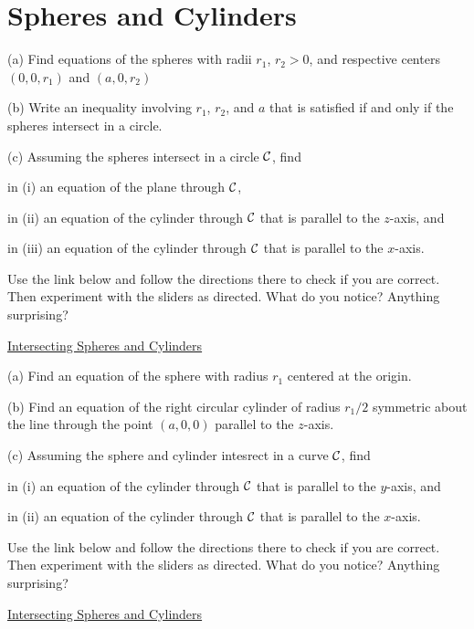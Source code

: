 \documentclass{ximera}
\begin{document}
\section{Spheres and Cylinders}
\begin{question}   \label{Q87:Coordinates}
(a) Find equations of the spheres with radii $r_1$, $r_2>0$, and respective centers $(0,0,r_1)$ and $(a,0,r_2)$

(b) Write an inequality involving $r_1$, $r_2$, and $a$ that is satisfied if and only if the spheres intersect in a circle.

(c) Assuming the spheres intersect in a circle  ${\cal C}$, find 

 in (i) an equation of the plane through  ${\cal C}$,

 in (ii) an equation of the cylinder through  ${\cal C}$ that is parallel to the $z$-axis, and

 in (iii) an equation of the cylinder through  ${\cal C}$ that is parallel to the $x$-axis.

Use the link below and follow the directions there to check if you are correct. Then experiment with the sliders as directed. What do you notice? Anything surprising?

\href{https://www.desmos.com/3d/93aea43a95}{Intersecting Spheres and Cylinders}

\end{question}



\begin{question}   \label{Q88:Coordinates}
(a) Find an equation of the sphere with radius $r_1$ centered at the origin.

(b) Find an equation of the right circular cylinder of radius $r_1/2$ symmetric about the line through the point $(a,0,0)$ parallel to the $z$-axis.

(c) Assuming the sphere and cylinder intesrect in a curve  ${\cal C}$, find 


 in (i) an equation of the cylinder through  ${\cal C}$ that is parallel to the $y$-axis, and

 in (ii) an equation of the cylinder through  ${\cal C}$ that is parallel to the $x$-axis.

Use the link below and follow the directions there to check if you are correct. Then experiment with the sliders as directed. What do you notice? Anything surprising?

\href{https://www.desmos.com/3d/63f35399e3}{Intersecting Spheres and Cylinders}

\end{question}
\end{document}

